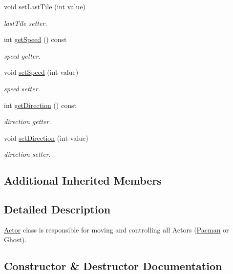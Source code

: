 \begin{DoxyCompactItemize}
void \mbox{\hyperlink{class_actor_a4d708f5e042cd6558947820f33520d61}{set\+Last\+Tile}} (int value)
\begin{DoxyCompactList}\small\item\em last\+Tile setter. \end{DoxyCompactList}\item 
int \mbox{\hyperlink{class_actor_ab50ceeaf6192f75be8ed9b41d8c585fb}{get\+Speed}} () const
\begin{DoxyCompactList}\small\item\em speed getter. \end{DoxyCompactList}\item 
void \mbox{\hyperlink{class_actor_aa678f8ed8724d19bd309e88b1e130840}{set\+Speed}} (int value)
\begin{DoxyCompactList}\small\item\em speed setter. \end{DoxyCompactList}\item 
int \mbox{\hyperlink{class_actor_a20bb92df0514cc00b31cb1a046548964}{get\+Direction}} () const
\begin{DoxyCompactList}\small\item\em direction getter. \end{DoxyCompactList}\item 
void \mbox{\hyperlink{class_actor_ad0049dcc53c477e38400b0c41536c51a}{set\+Direction}} (int value)
\begin{DoxyCompactList}\small\item\em direction setter. \end{DoxyCompactList}\end{DoxyCompactItemize}
\subsection*{Additional Inherited Members}


\subsection{Detailed Description}
\mbox{\hyperlink{class_actor}{Actor}} class is responsible for moving and controlling all Actors (\mbox{\hyperlink{class_pacman}{Pacman}} or \mbox{\hyperlink{class_ghost}{Ghost}}). 

\subsection{Constructor \& Destructor Documentation}
\mbox{\label{class_actor_a2a0ff4335a1ee9096df90f288c026c8b}} 

